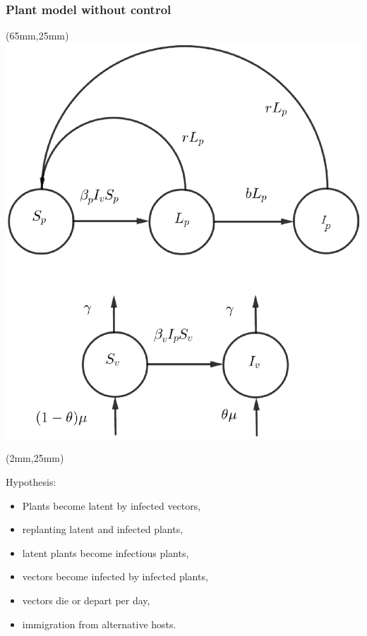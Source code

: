
\begin{frame}{}
	\begin{bibunit}[abbrv]
		\nocite{Holt1999b}
		\putbib
	\end{bibunit}
\end{frame}

\begin{frame}[plain]
	\frametitle{Plant model without control}
		\begin{textblock*}{60mm}(65mm,25mm)
			\includegraphics[width=\linewidth]{Feathergraphics/plant_diagram.eps}
		\end{textblock*}
		\begin{textblock*}{60mm}(2mm,25mm)
			\begin{graybox}{Hypothesis:}
				
				\begin{itemize}
					\item<1-> Plants become latent by infected vectors,
					\item<2-> replanting latent and infected plants,
					\item<3-> latent plants become infectious plants,
					\item<4-> vectors become infected by infected plants,
					\item<5-> vectors die or depart per day,
					\item<6-> immigration from alternative hosts.
				\end{itemize}
			\end{graybox}	
		\end{textblock*}
\end{frame}

